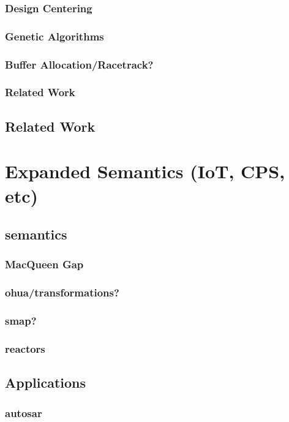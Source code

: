 \documentclass{report}
\begin{document}
\section{Design Centering}
\section{Genetic Algorithms}
\section{Buffer Allocation/Racetrack?}

\section{Related Work}

\chapter{Related Work}

\part{Expanded Semantics (IoT, CPS, etc)}

\chapter{semantics}
\section{MacQueen Gap}
\section{ohua/transformations?}
\section{smap?}
\section{reactors}

\chapter{Applications}
\section{autosar}
\end{document}
